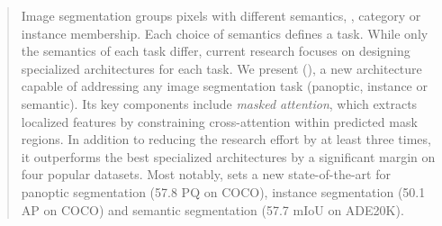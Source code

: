 \begin{abstract}

Image segmentation groups %
pixels with different semantics, \eg, category or instance membership. %
Each choice of semantics defines a task. %
While only the semantics of each task differ,
current research focuses on designing specialized architectures for each task.
We present \modelnamelong (\modelname), a new architecture capable of addressing any image segmentation task (panoptic, instance or semantic).
Its key components include \emph{masked attention}, which extracts localized features by constraining cross-attention within predicted mask regions. %
In addition to reducing the research effort by at least three times, it outperforms the best specialized architectures by a significant margin on four popular datasets.
Most notably, \modelname sets a new state-of-the-art for panoptic segmentation (57.8 PQ on COCO), instance segmentation (50.1 AP on COCO) and semantic segmentation (57.7 mIoU on ADE20K).
\end{abstract}







